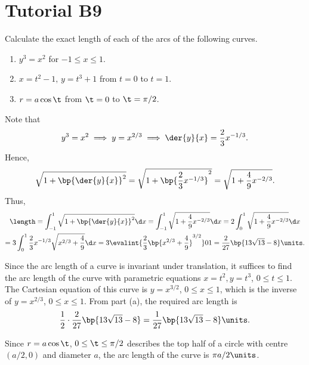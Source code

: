 \section{Tutorial B9}

\begin{problem}
    Calculate the exact length of each of the arcs of the following curves.

    \begin{enumerate}
        \item $y^3 = x^2$ for $-1 \leq x \leq 1$.
        \item $x = t^2 - 1, \, y = t^3 + 1$ from $t = 0$ to $t = 1$.
        \item $r = a\cos\t$ from $\t = 0$ to $\t = \pi/2$.
    \end{enumerate}
\end{problem}
\begin{solution}
    \begin{ppart}
        Note that \[y^3 = x^2 \implies y = x^{2/3} \implies \der{y}{x} = \frac23 x^{-1/3}.\] Hence, \[\sqrt{1 + \bp{\der{y}{x}}^2} = \sqrt{1 + \bp{\frac23 x^{-1/3}}^2} = \sqrt{1 + \frac49 x^{-2/3}}.\] Thus,
        \begin{gather*}
            \length = \int_{-1}^1 \sqrt{1 + \bp{\der{y}{x}}^2} \d x = \int_{-1}^1 \sqrt{1 + \frac49 x^{-2/3}} \d x = 2 \int_0^1 \sqrt{1 + \frac49 x^{-2/3}} \d x \\
            = 3 \int_0^1 \frac23 x^{-1/3} \sqrt{x^{2/3} + \frac49} \d x = 3 \evalint{\frac23 \bp{x^{2/3} + \frac49}^{3/2}}01 = \frac2{27} \bp{13\sqrt{13} - 8} \units.
        \end{gather*}
    \end{ppart}
    \begin{ppart}
        Since the arc length of a curve is invariant under translation, it suffices to find the arc length of the curve with parametric equations $x = t^2, y = t^3$, $0 \leq t \leq 1$. The Cartesian equation of this curve is $y = x^{3/2}$, $0 \leq x \leq 1$, which is the inverse of $y = x^{2/3}$, $0 \leq x \leq 1$. From part (a), the required arc length is \[\frac12 \cdot \frac2{27} \bp{13\sqrt{13} - 8} = \frac1{27} \bp{13 \sqrt{13} - 8} \units.\]
    \end{ppart}
    \begin{ppart}
        Since $r = a\cos\t$, $0 \leq \t \leq \pi/2$ describes the top half of a circle with centre $(a/2, 0)$ and diameter $a$, the arc length of the curve is $\pi a /2 \units$.
    \end{ppart}
\end{solution}

